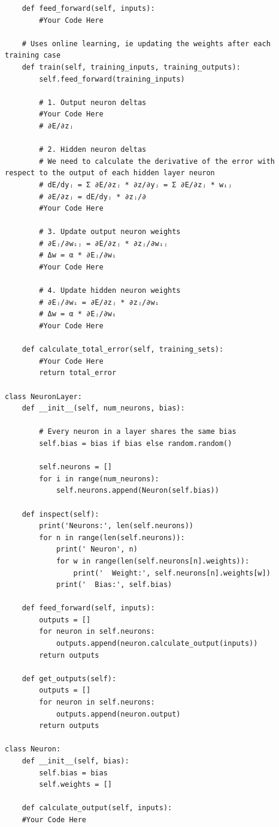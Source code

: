 \documentclass[a4paper, 11pt]{article}
\begin{document}
\begin{enumerate}
\begin{lstlisting}
    def feed_forward(self, inputs):
        #Your Code Here

    # Uses online learning, ie updating the weights after each training case
    def train(self, training_inputs, training_outputs):
        self.feed_forward(training_inputs)

        # 1. Output neuron deltas        
        #Your Code Here
        # ∂E/∂zⱼ       

        # 2. Hidden neuron deltas        
        # We need to calculate the derivative of the error with respect to the output of each hidden layer neuron
        # dE/dyⱼ = Σ ∂E/∂zⱼ * ∂z/∂yⱼ = Σ ∂E/∂zⱼ * wᵢⱼ
        # ∂E/∂zⱼ = dE/dyⱼ * ∂zⱼ/∂
        #Your Code Here

        # 3. Update output neuron weights
        # ∂Eⱼ/∂wᵢⱼ = ∂E/∂zⱼ * ∂zⱼ/∂wᵢⱼ             
        # Δw = α * ∂Eⱼ/∂wᵢ
        #Your Code Here        

        # 4. Update hidden neuron weights
        # ∂Eⱼ/∂wᵢ = ∂E/∂zⱼ * ∂zⱼ/∂wᵢ    
        # Δw = α * ∂Eⱼ/∂wᵢ
        #Your Code Here
                
    def calculate_total_error(self, training_sets):
        #Your Code Here
        return total_error

class NeuronLayer:
    def __init__(self, num_neurons, bias):

        # Every neuron in a layer shares the same bias
        self.bias = bias if bias else random.random()

        self.neurons = []
        for i in range(num_neurons):
            self.neurons.append(Neuron(self.bias))

    def inspect(self):
        print('Neurons:', len(self.neurons))
        for n in range(len(self.neurons)):
            print(' Neuron', n)
            for w in range(len(self.neurons[n].weights)):
                print('  Weight:', self.neurons[n].weights[w])
            print('  Bias:', self.bias)

    def feed_forward(self, inputs):
        outputs = []
        for neuron in self.neurons:
            outputs.append(neuron.calculate_output(inputs))
        return outputs

    def get_outputs(self):
        outputs = []
        for neuron in self.neurons:
            outputs.append(neuron.output)
        return outputs

class Neuron:
    def __init__(self, bias):
        self.bias = bias
        self.weights = []

    def calculate_output(self, inputs):
    #Your Code Here


\end{lstlisting}
\end{enumerate}
\end{document}
